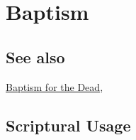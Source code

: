 \section{Baptism}
	\label{BAPTISM}
	
\subsection{See also}

	\hyperref[BAPTISMDEAD]{Baptism for the Dead},





\subsection{Scriptural Usage} %
	\label{BAPTISM-SCRIPTURES}

	
	

